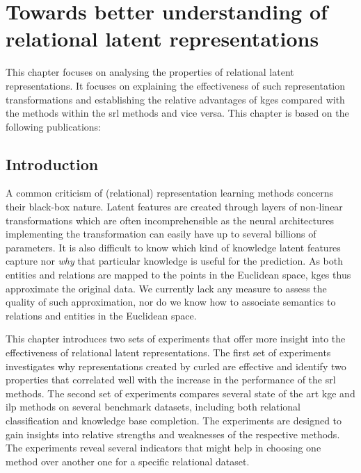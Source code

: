 \chapter{Towards better understanding of relational latent representations}\label{ch:embeddinganalysis}


This chapter focuses on analysing the properties of relational latent representations.
It focuses on explaining the effectiveness of such representation transformations and establishing the relative advantages of \gls{kge}s compared with the methods within the \gls{srl} methods and vice versa.
This chapter is based on the following publications:

\begin{quote}
\end{quote}


\begin{quote}
\end{quote}

\begin{quote}
\end{quote}

\section{Introduction}





A common criticism of  (relational) representation learning methods concerns their black-box nature.
Latent features are created through layers of non-linear transformations which are often incomprehensible as the neural architectures implementing the transformation can easily have up to several billions of parameters.
It is also difficult to know which kind of knowledge latent features capture nor \textit{why} that particular knowledge is useful for the prediction.
As both entities and relations are mapped to the points in the Euclidean space, \gls{kge}s thus approximate the original data.
We currently lack any measure to assess the quality of such approximation, nor do we know how to associate semantics to relations and entities in the Euclidean space.



This chapter introduces two sets of experiments that offer more insight into the effectiveness of relational latent representations.
The first set of experiments investigates why representations created by \gls{curled} are effective and identify two properties that correlated well with the increase in the performance of the \gls{srl} methods.
The second set of experiments compares several state of the art \gls{kge} and \gls{ilp} methods on several benchmark datasets, including both relational classification and knowledge base completion.
The experiments are designed to gain insights into relative strengths and weaknesses of the respective methods.
The experiments reveal several indicators that might help in choosing one method over another one for a specific  relational dataset.






